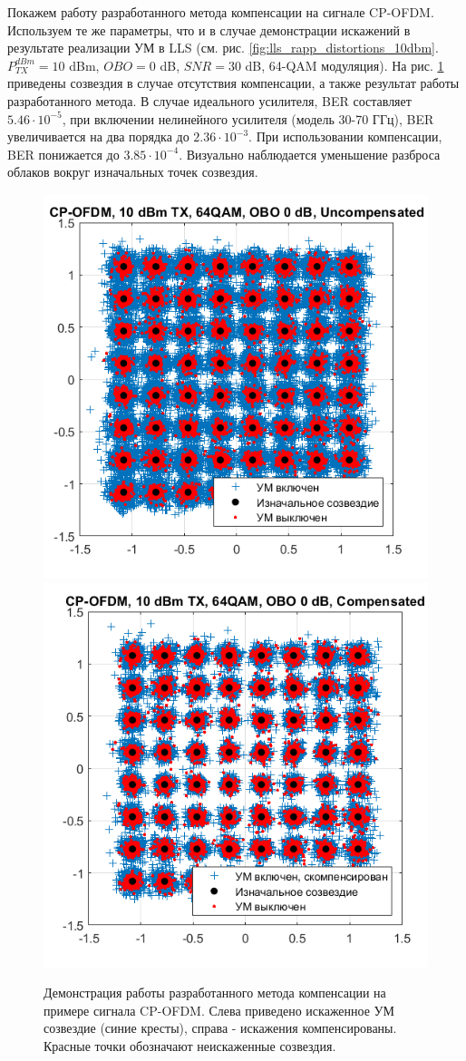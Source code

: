 Покажем работу разработанного метода компенсации на сигнале CP-OFDM.
Используем те же параметры, что и в случае демонстрации искажений в
результате реализации УМ в LLS (см. рис.
\ref{fig:lls_rapp_distortions_10dbm}. $P^{dBm}_{TX} = 10$ dBm, $OBO = 0$
dB, $SNR=30$ dB, 64-QAM модуляция). На рис.
\ref{fig:ofdm_lls_compensation_10dbm} приведены созвездия в случае
отсутствия компенсации, а также результат работы разработанного метода.
В случае идеального усилителя, BER составляет $5.46\cdot 10^{-5}$, при включении
нелинейного усилителя (модель 30-70 ГГц), BER увеличивается на два порядка
до $2.36\cdot 10^{-3}$. При использовании компенсации, BER понижается до
$3.85\cdot 10^{-4}$. Визуально наблюдается уменьшение разброса облаков
вокруг изначальных точек созвездия.

\begin{figure}[h!]
    \centering
    \includegraphics[width=0.45\linewidth]{figs/ofdm_pa_on_obo0_TX10_noPN2.png}
    \includegraphics[width=0.45\linewidth]{figs/ofdm_pa_on_comp_obo0_TX10_noPN.png}
    \caption{Демонстрация работы разработанного метода компенсации на
    примере сигнала CP-OFDM. Слева приведено искаженное УМ созвездие (синие
    кресты), справа - искажения компенсированы. Красные точки обозначают
    неискаженные созвездия.}
    \label{fig:ofdm_lls_compensation_10dbm}
\end{figure}



